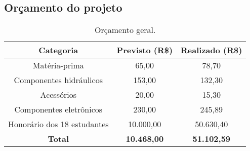 \begin{landscape}

\chapter{Orçamento do projeto}

\begin{table}[htpb]
\centering
\caption{Orçamento geral.}
\begin{tabular}{|c|c|c|}
\hline
\textbf{Categoria}                 & \textbf{Previsto (R\$)} & \textbf{Realizado (R\$)} \\ \hline
Matéria-prima                     & 65,00                   & 78,70                    \\ \hline
Componentes hidráulicos           & 153,00                  & 132,30                   \\ \hline
Acessórios                        & 20,00                   & 15,30                    \\ \hline
Componentes eletrônicos           & 230,00                  & 245,89                   \\ \hline
Honorário dos 18 estudantes   & 10.000,00               & 50.630,40                \\ \hline
\textbf{Total}                    & \textbf{10.468,00}      & \textbf{51.102,59}       \\ \hline
\end{tabular}
\end{table}
    

    



\vspace{1cm}


\end{landscape}
